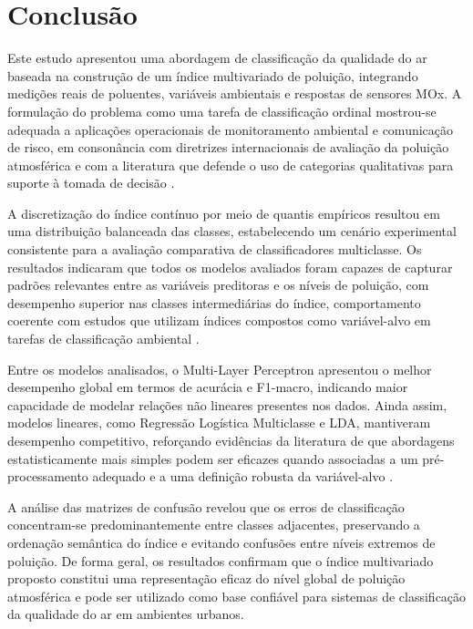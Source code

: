 \section{Conclusão}

Este estudo apresentou uma abordagem de classificação da qualidade do ar baseada na construção de um índice multivariado de poluição, integrando medições reais de poluentes, variáveis ambientais e respostas de sensores MOx. A formulação do problema como uma tarefa de classificação ordinal mostrou-se adequada a aplicações operacionais de monitoramento ambiental e comunicação de risco, em consonância com diretrizes internacionais de avaliação da poluição atmosférica e com a literatura que defende o uso de categorias qualitativas para suporte à tomada de decisão \cite{who_air_pollution_2022, athanasiadis2006classification}.

A discretização do índice contínuo por meio de quantis empíricos resultou em uma distribuição balanceada das classes, estabelecendo um cenário experimental consistente para a avaliação comparativa de classificadores multiclasse. Os resultados indicaram que todos os modelos avaliados foram capazes de capturar padrões relevantes entre as variáveis preditoras e os níveis de poluição, com desempenho superior nas classes intermediárias do índice, comportamento coerente com estudos que utilizam índices compostos como variável-alvo em tarefas de classificação ambiental \cite{Putra2020}.

Entre os modelos analisados, o Multi-Layer Perceptron apresentou o melhor desempenho global em termos de acurácia e F1-macro, indicando maior capacidade de modelar relações não lineares presentes nos dados. Ainda assim, modelos lineares, como Regressão Logística Multiclasse e LDA, mantiveram desempenho competitivo, reforçando evidências da literatura de que abordagens estatisticamente mais simples podem ser eficazes quando associadas a um pré-processamento adequado e a uma definição robusta da variável-alvo \cite{Ali2022}.

A análise das matrizes de confusão revelou que os erros de classificação concentram-se predominantemente entre classes adjacentes, preservando a ordenação semântica do índice e evitando confusões entre níveis extremos de poluição. De forma geral, os resultados confirmam que o índice multivariado proposto constitui uma representação eficaz do nível global de poluição atmosférica e pode ser utilizado como base confiável para sistemas de classificação da qualidade do ar em ambientes urbanos.
